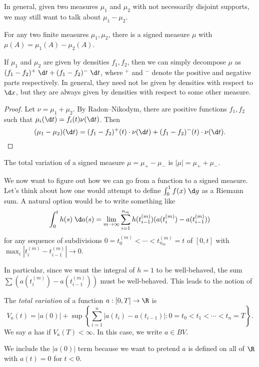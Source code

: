 \documentclass[a4paper]{article}
\begin{document}
In general, given two measures $\mu_1$ and $\mu_2$ with not necessarily disjoint supports, we may still want to talk about $\mu_1 - \mu_2$.
\begin{thm}
  For any two finite measures $\mu_1, \mu_2$, there is a signed measure $\mu$ with $\mu(A) = \mu_1(A) - \mu_2(A)$.
\end{thm}

If $\mu_1$ and $\mu_2$ are given by densities $f_1, f_2$, then we can simply decompose $\mu$ as $(f_1 - f_2)^+\;\d t + (f_1 - f_2)^- \;\d t$, where $^+$ and $^-$ denote the positive and negative parts respectively. In general, they need not be given by densities with respect to $\d x$, but they are always given by densities with respect to some other measure.
\begin{proof}
  Let $\nu = \mu_1 + \mu_2$. By Radon--Nikodym, there are positive functions $f_1, f_2$ such that $\mu_i(\d t) = f_i(t) \nu(\d t)$. Then
  \[
    (\mu_1 - \mu_2)(\d t) = (f_1 - f_2)^+(t) \cdot \nu(\d t) + (f_1 - f_2)^- (t) \cdot \nu(\d t).\qedhere
  \]
\end{proof}

\begin{defi}
  The total variation of a signed measure $\mu = \mu_+ - \mu_-$ is $|\mu| = \mu_+ + \mu_-$.
\end{defi}

We now want to figure out how we can go from a function to a signed measure. Let's think about how one would attempt to define $\int_0^1 f(x)\;\d g$ as a Riemann sum. A natural option would be to write something like
\[
  \int_0^t h(s) \;\d a(s) = \lim_{m \to \infty} \sum_{i = 1}^{n_m} h(t_{i - 1}^{(m)}) (a (t_i^{(m)}) - a(t_{i - 1}^{(m)}))
\]
for any sequence of subdivisions $0 = t_0^{(m)} < \cdots < t_{n_m}^{(m)} = t$ of $[0, t]$ with $\max_i |t_i^{(m)} - t_{i - 1}^{(m)}| \to 0$.

In particular, since we want the integral of $h = 1$ to be well-behaved, the sum $\sum (a(t_i^{(m)}) - a(t_{i - 1}^{(m)}))$ must be well-behaved. This leads to the notion of
\begin{defi}
  The \emph{total variation} of a function $a: [0, T] \to \R$ is
  \[
    V_a(t) = |a(0)| + \sup \left\{\sum_{i = 1}^n |a(t_i) - a(t_{i - 1})|: 0 = t_0 < t_1 < \cdots < t_n = T\right\}.
  \]
  We say $a$ has  if $V_a(T) < \infty$. In this case, we write $a \in BV$.
\end{defi}
We include the $|a(0)|$ term because we want to pretend $a$ is defined on all of $\R$ with $a(t) = 0$ for $t < 0$.
\end{document}
